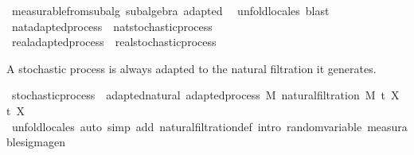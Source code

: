 \begin{isabellebody}
\endisadelimproof
%
\isatagproof
{}\isamarkupfalse%
\ measurable{\isacharunderscore}{\kern0pt}from{\isacharunderscore}{\kern0pt}subalg\ subalgebra\ adapted\ \isamarkupfalse%
\ {\isacharparenleft}{\kern0pt}unfold{\isacharunderscore}{\kern0pt}locales{\isacharparenright}{\kern0pt}\ blast%
\endisatagproof
{\isafoldproof}%
%
\isadelimproof
%
\endisadelimproof
\isanewline
\isanewline
{}\isamarkupfalse%
\ nat{\isacharunderscore}{\kern0pt}adapted{\isacharunderscore}{\kern0pt}process\ {\isasymsubseteq}\ nat{\isacharunderscore}{\kern0pt}stochastic{\isacharunderscore}{\kern0pt}process%
\isadelimproof
\ %
\endisadelimproof
%
\isatagproof
\isacommand{{\isachardot}{\kern0pt}{\isachardot}{\kern0pt}}\isamarkupfalse%
%
\endisatagproof
{\isafoldproof}%
%
\isadelimproof
%
\endisadelimproof
\isanewline
{}\isamarkupfalse%
\ real{\isacharunderscore}{\kern0pt}adapted{\isacharunderscore}{\kern0pt}process\ {\isasymsubseteq}\ real{\isacharunderscore}{\kern0pt}stochastic{\isacharunderscore}{\kern0pt}process%
\isadelimproof
\ %
\endisadelimproof
%
\isatagproof
\isacommand{{\isachardot}{\kern0pt}{\isachardot}{\kern0pt}}\isamarkupfalse%
%
\endisatagproof
{\isafoldproof}%
%
\isadelimproof
%
\endisadelimproof
%
\begin{isamarkuptext}%
A stochastic process is always adapted to the natural filtration it generates.%
\end{isamarkuptext}\isamarkuptrue%
\isamarkupfalse%
\ stochastic{\isacharunderscore}{\kern0pt}process\ {\isasymsubseteq}\ adapted{\isacharunderscore}{\kern0pt}natural{\isacharcolon}{\kern0pt}\ adapted{\isacharunderscore}{\kern0pt}process\ M\ {\isachardoublequoteopen}natural{\isacharunderscore}{\kern0pt}filtration\ M\ t\ X{\isachardoublequoteclose}\ t\ X%
\isadelimproof
\ %
\endisadelimproof
%
\isatagproof
{}\isamarkupfalse%
\ {\isacharparenleft}{\kern0pt}unfold{\isacharunderscore}{\kern0pt}locales{\isacharparenright}{\kern0pt}\ {\isacharparenleft}{\kern0pt}auto\ simp\ add{\isacharcolon}{\kern0pt}\ natural{\isacharunderscore}{\kern0pt}filtration{\isacharunderscore}{\kern0pt}def\ intro{\isacharcolon}{\kern0pt}\ random{\isacharunderscore}{\kern0pt}variable\ measurable{\isacharunderscore}{\kern0pt}sigma{\isacharunderscore}{\kern0pt}gen{\isacharparenright}{\kern0pt}%
\endisatagproof
{\isafoldproof}%
%
\isadelimproof
%
\endisadelimproof
%
\isadelimdocument
%
\endisadelimdocument
%
\isatagdocument
%
\end{isabellebody}
